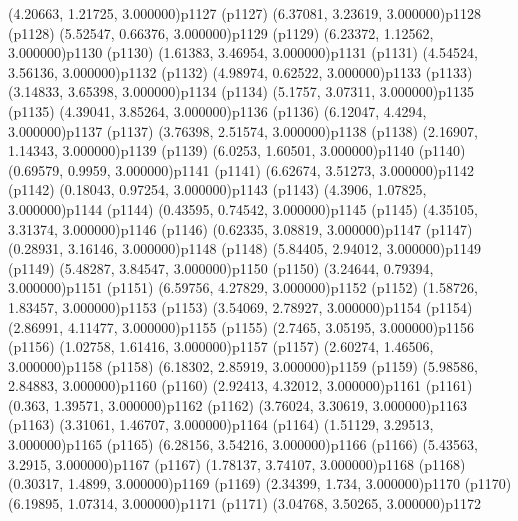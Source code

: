 \psPoint(4.20663, 1.21725, 3.000000){p1127}
\psdot(p1127)
\psPoint(6.37081, 3.23619, 3.000000){p1128}
\psdot(p1128)
\psPoint(5.52547, 0.66376, 3.000000){p1129}
\psdot(p1129)
\psPoint(6.23372, 1.12562, 3.000000){p1130}
\psdot(p1130)
\psPoint(1.61383, 3.46954, 3.000000){p1131}
\psdot(p1131)
\psPoint(4.54524, 3.56136, 3.000000){p1132}
\psdot(p1132)
\psPoint(4.98974, 0.62522, 3.000000){p1133}
\psdot(p1133)
\psPoint(3.14833, 3.65398, 3.000000){p1134}
\psdot(p1134)
\psPoint(5.1757, 3.07311, 3.000000){p1135}
\psdot(p1135)
\psPoint(4.39041, 3.85264, 3.000000){p1136}
\psdot(p1136)
\psPoint(6.12047, 4.4294, 3.000000){p1137}
\psdot(p1137)
\psPoint(3.76398, 2.51574, 3.000000){p1138}
\psdot(p1138)
\psPoint(2.16907, 1.14343, 3.000000){p1139}
\psdot(p1139)
\psPoint(6.0253, 1.60501, 3.000000){p1140}
\psdot(p1140)
\psPoint(0.69579, 0.9959, 3.000000){p1141}
\psdot(p1141)
\psPoint(6.62674, 3.51273, 3.000000){p1142}
\psdot(p1142)
\psPoint(0.18043, 0.97254, 3.000000){p1143}
\psdot(p1143)
\psPoint(4.3906, 1.07825, 3.000000){p1144}
\psdot(p1144)
\psPoint(0.43595, 0.74542, 3.000000){p1145}
\psdot(p1145)
\psPoint(4.35105, 3.31374, 3.000000){p1146}
\psdot(p1146)
\psPoint(0.62335, 3.08819, 3.000000){p1147}
\psdot(p1147)
\psPoint(0.28931, 3.16146, 3.000000){p1148}
\psdot(p1148)
\psPoint(5.84405, 2.94012, 3.000000){p1149}
\psdot(p1149)
\psPoint(5.48287, 3.84547, 3.000000){p1150}
\psdot(p1150)
\psPoint(3.24644, 0.79394, 3.000000){p1151}
\psdot(p1151)
\psPoint(6.59756, 4.27829, 3.000000){p1152}
\psdot(p1152)
\psPoint(1.58726, 1.83457, 3.000000){p1153}
\psdot(p1153)
\psPoint(3.54069, 2.78927, 3.000000){p1154}
\psdot(p1154)
\psPoint(2.86991, 4.11477, 3.000000){p1155}
\psdot(p1155)
\psPoint(2.7465, 3.05195, 3.000000){p1156}
\psdot(p1156)
\psPoint(1.02758, 1.61416, 3.000000){p1157}
\psdot(p1157)
\psPoint(2.60274, 1.46506, 3.000000){p1158}
\psdot(p1158)
\psPoint(6.18302, 2.85919, 3.000000){p1159}
\psdot(p1159)
\psPoint(5.98586, 2.84883, 3.000000){p1160}
\psdot(p1160)
\psPoint(2.92413, 4.32012, 3.000000){p1161}
\psdot(p1161)
\psPoint(0.363, 1.39571, 3.000000){p1162}
\psdot(p1162)
\psPoint(3.76024, 3.30619, 3.000000){p1163}
\psdot(p1163)
\psPoint(3.31061, 1.46707, 3.000000){p1164}
\psdot(p1164)
\psPoint(1.51129, 3.29513, 3.000000){p1165}
\psdot(p1165)
\psPoint(6.28156, 3.54216, 3.000000){p1166}
\psdot(p1166)
\psPoint(5.43563, 3.2915, 3.000000){p1167}
\psdot(p1167)
\psPoint(1.78137, 3.74107, 3.000000){p1168}
\psdot(p1168)
\psPoint(0.30317, 1.4899, 3.000000){p1169}
\psdot(p1169)
\psPoint(2.34399, 1.734, 3.000000){p1170}
\psdot(p1170)
\psPoint(6.19895, 1.07314, 3.000000){p1171}
\psdot(p1171)
\psPoint(3.04768, 3.50265, 3.000000){p1172}

